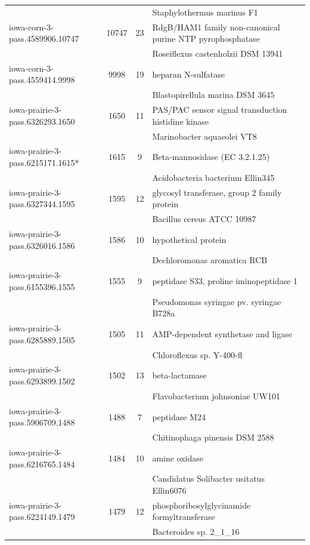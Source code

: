 \documentclass{pnastwo}
\begin{document}
\begin{table}
\begin{tabular}{@{\extracolsep{\fill}}lccl}
	&		&		&	Staphylothermus marinus F1	\\
iowa-corn-3-pass.4589906.10747	&	10747	&	23	&	RdgB/HAM1 family non-canonical purine NTP pyrophosphatase	\\
	&		&		&	Roseiflexus castenholzii DSM 13941	\\
iowa-corn-3-pass.4559414.9998&	9998	&	19	&	heparan N-sulfatase	\\
	&		&		&	Blastopirellula marina DSM 3645	\\
iowa-prairie-3-pass.6326293.1650	&	1650	&	11	&	PAS/PAC sensor signal transduction histidine kinase	\\
	&		&		&	Marinobacter aquaeolei VT8	\\
iowa-prairie-3-pass.6215171.1615*	&	1615	&	9	&	Beta-mannosidase (EC 3.2.1.25)	\\
	&		&		&	Acidobacteria bacterium Ellin345	\\
iowa-prairie-3-pass.6327344.1595	&	1595	&	12	&	glycosyl transferase, group 2 family protein	\\
	&		&		&	Bacillus cereus ATCC 10987	\\
iowa-prairie-3-pass.6326016.1586	&	1586	&	10	&	hypothetical protein	\\
	&		&		&	Dechloromonas aromatica RCB	\\
iowa-prairie-3-pass.6155396.1555	&	1555	&	9	&	peptidase S33, proline iminopeptidase 1	\\
	&		&		&	Pseudomonas syringae pv. syringae B728a	\\
iowa-prairie-3-pass.6285889.1505	&	1505	&	11	&	AMP-dependent synthetase and ligase	\\
	&		&		&	Chloroflexus sp. Y-400-fl	\\
iowa-prairie-3-pass.6293899.1502	&	1502	&	13	&	beta-lactamase	\\
	&		&		&	Flavobacterium johnsoniae UW101	\\
iowa-prairie-3-pass.5906709.1488	&	1488	&	7	&	peptidase M24	\\
	&		&		&	Chitinophaga pinensis DSM 2588	\\
iowa-prairie-3-pass.6216765.1484	&	1484	&	10	&	amine oxidase	\\
	&		&		&	Candidatus Solibacter usitatus Ellin6076	\\
iowa-prairie-3-pass.6224149.1479	&	1479	&	12	&	phosphoribosylglycinamide formyltransferase 	\\
& & & Bacteroides sp. 2\_1\_16\\
\hline
\end{tabular}
\label{read-map}
\end{table}
\end{document}
